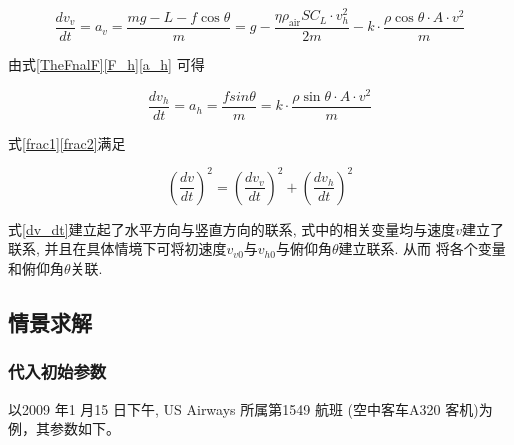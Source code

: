 \documentclass{cumcmthesis}
\begin{document}
\begin{equation}
\frac{dv_v}{dt} = a_v = \frac{mg - L - f\cos\theta}{m} = 
g - \frac{\eta \rho_{\text{air}} S C_L \cdot v_h^2}{2m} - 
k \cdot \frac{\rho \cos\theta \cdot A \cdot v^2}{m}
\label{frac1}
\end{equation}

由式\eqref{TheFnalF}\eqref{F_h}\eqref{a_h} 可得

\begin{equation}
\frac{dv_h}{dt} = a_h = \frac{fsin\theta}{m} =
 k \cdot \frac{\rho \sin\theta \cdot A \cdot v^2}{m}
\label{frac2}
\end{equation}

式\eqref{frac1}\eqref{frac2}满足

\begin{equation}
\left(\frac{dv}{dt}\right)^2=\left(\frac{dv_v}{dt}\right)^2 + \left(\frac{dv_h}{dt}\right)^2
\label{dv_dt} 
\end{equation}

式\eqref{dv_dt}建立起了水平方向与竖直方向的联系, 式中的相关变量均与速度$v$建立了联系, 
并且在具体情境下可将初速度$v_{v0}$与$v_{h0}$与俯仰角$\theta$建立联系. 从而
将各个变量和俯仰角$\theta$关联. 

\subsection{情景求解}
\subsubsection{代入初始参数}
以2009 年1 月15 日下午, US Airways 所属第1549 航班 (空中客车A320 客机)为例，其参数如下。
\end{document}
